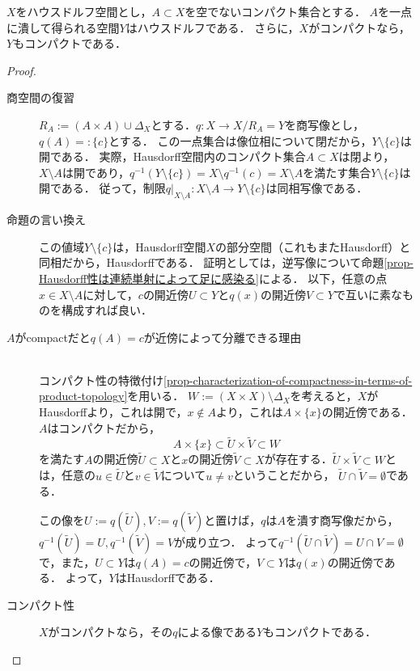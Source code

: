 \documentclass[uplatex,dvipdfmx]{jsreport}
\begin{document}
\begin{proposition}[ハウスドルフはコンパクト集合を一点に潰してもハウスドルフである]\label{prop-compact-Hausdorff-after-one-point-quotient-map}
    $X$をハウスドルフ空間とし，$A\subset X$を空でないコンパクト集合とする．
    $A$を一点に潰して得られる空間$Y$はハウスドルフである．
    さらに，$X$がコンパクトなら，$Y$もコンパクトである．
\end{proposition}
\begin{proof}\mbox{}
    \begin{description}
        \item[商空間の復習] 
        $R_A:=(A\times A)\cup\Delta_X$とする．$q:X\to X/R_A=Y$を商写像とし，$q(A)=:\{c\}$とする．
        この一点集合は像位相について閉だから，$Y\setminus\{c\}$は開である．
        実際，Hausdorff空間内のコンパクト集合$A\subset X$は閉より，$X\setminus A$は開であり，$q^{-1}(Y\setminus\{c\})=X\setminus q^{-1}(c)=X\setminus A$を満たす集合$Y\setminus\{c\}$は開である．
        従って，制限$q|_{X\setminus A}:X\setminus A\to Y\setminus\{c\}$は同相写像である．
        \item[命題の言い換え]
        この値域$Y\setminus\{c\}$は，Hausdorff空間$X$の部分空間（これもまたHausdorff）と同相だから，Hausdorffである．
        証明としては，逆写像について命題\ref{prop-Hausdorff性は連続単射によって足に感染る}による．
        以下，任意の点$x\in X\setminus A$に対して，$c$の開近傍$U\subset Y$と$q(x)$の開近傍$V\subset Y$で互いに素なものを構成すれば良い．
        \item[$A$がcompactだと$q(A)=c$が近傍によって分離できる理由] \mbox{}\\
        コンパクト性の特徴付け\ref{prop-characterization-of-compactness-in-terms-of-product-topology}を用いる．
        $W:=(X\times X)\setminus\Delta_X$を考えると，$X$がHausdorffより，これは開で，$x\notin A$より，これは$A\times\{x\}$の開近傍である．
        $A$はコンパクトだから，
        \[A\times\{x\}\subset\tilde{U}\times\tilde{V}\subset W\]
        を満たす$A$の開近傍$\tilde{U}\subset X$と$x$の開近傍$\tilde{V}\subset X$が存在する．$\tilde{U}\times\tilde{V}\subset W$とは，任意の$u\in\tilde{U}$と$v\in\tilde{V}$について$u\ne v$ということだから，
        $\tilde{U}\cap\tilde{V}=\emptyset$である．

        この像を$U:=q(\tilde{U}),V:=q(\tilde{V})$と置けば，$q$は$A$を潰す商写像だから，$q^{-1}(\tilde{U})=U,q^{-1}(\tilde{V})=V$が成り立つ．
        よって$q^{-1}(\tilde{U}\cap\tilde{V})=U\cap V=\emptyset$で，また，$U\subset Y$は$q(A)=c$の開近傍で，$V\subset Y$は$q(x)$の開近傍である．
        よって，$Y$はHausdorffである．
        \item[コンパクト性] $X$がコンパクトなら，その$q$による像である$Y$もコンパクトである．
    \end{description}
\end{proof}
\end{document}
